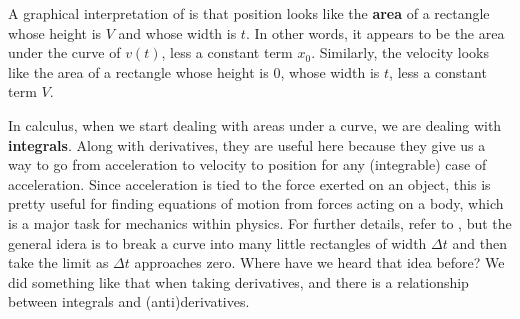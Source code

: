 \documentclass{tufte-handout}
\begin{document}
A graphical interpretation of  is that position looks like the \textbf{area} of a rectangle whose height is $V$ and whose width is $t$. In other words, it appears to be the area under the curve of $v(t)$, less a constant term $x_0$. Similarly, the velocity looks like the area of a rectangle whose height is $0$, whose width is $t$, less a constant term $V$. 

In calculus, when we start dealing with areas under a curve, we are dealing with \textbf{integrals}\cite{greenspan1987calculus, kreysig2015advanced}. Along with derivatives, they are useful here because they give us a way to go from acceleration to velocity to position for any (integrable) case of acceleration. Since acceleration is tied to the force exerted on an object, this is pretty useful for finding equations of motion from forces acting on a body, which is a major task for mechanics within physics. For further details, refer to \cite{greenspan1987calculus}, but the general idera is to break a curve into many little rectangles of width $\Delta t$ and then take the limit as $\Delta t$ approaches zero. Where have we heard that idea before? We did something like that when taking derivatives, and there is a relationship between integrals and (anti)derivatives. 
\end{document}
